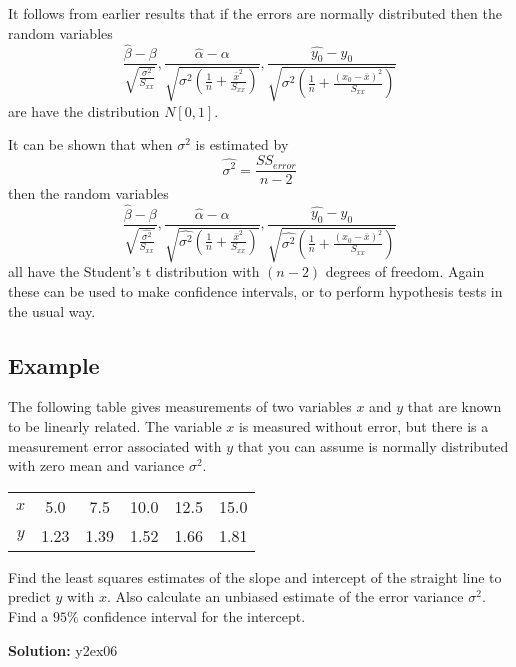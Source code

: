 \documentclass[12pt]{article}
\newenvironment{example}[1][Example:]{\begin{trivlist}
\item[\hskip \labelsep {\bfseries #1}]}{\end{trivlist}}
\begin{document}
It follows from earlier results that if the errors are normally distributed then the random variables
$$\frac{\hat{\beta}-\beta}{\sqrt{\frac{\sigma^{2}}{S_{xx}}}}, \frac{\hat{\alpha}-\alpha}{\sqrt{\sigma^{2}\left(\frac{1}{n}+\frac{\bar{x}^{2}}{S_{xx}}\right)}}, \frac{\hat{y_{0}}-y_{0}}{\sqrt{\sigma^{2}\left(\frac{1}{n}+\frac{(x_{0}-\bar{x})^{2}}{S_{xx}}\right)}}$$
are have the distribution $N[0,1].$

It can be shown that when $\sigma^{2}$ is estimated by $$\hat{\sigma^{2}}=\frac{SS_{error}}{n-2}$$ then the random variables
$$\frac{\hat{\beta}-\beta}{\sqrt{\frac{\hat{\sigma^{2}}}{S_{xx}}}}, \frac{\hat{\alpha}-\alpha}{\sqrt{\hat{\sigma^{2}}\left(\frac{1}{n}+\frac{\bar{x}^{2}}{S_{xx}}\right)}}, \frac{\hat{y_{0}}-y_{0}}{\sqrt{\hat{\sigma^{2}}\left(\frac{1}{n}+\frac{(x_{0}-\bar{x})^{2}}{S_{xx}}\right)}}$$
all have the Student's t distribution with $(n-2)$ degrees of freedom. Again these can be used to make confidence intervals, or to perform hypothesis tests in the usual way.

\subsection{Example}
\begin{example}
The following table gives measurements of two variables $x$ and $y$ that are known to be linearly related. The variable $x$ is measured without error, but there is a measurement error associated with $y$ that you can assume is normally distributed with zero mean and variance $\sigma^{2}$.
\begin{center}
\begin{tabular}{|c|c|c|c|c|c|}
  \hline
$x$&	 5.0&	 7.5&	10.0&	12.5&	15.0\\
$y$& 	1.23&	1.39&	1.52&	1.66&	1.81 \\
  \hline
\end{tabular}
\end{center}
Find the least squares estimates of the slope and intercept of the straight line to predict $y$ with $x$. Also calculate an unbiased estimate of the error variance $\sigma^{2}$. Find a $95\%$ confidence interval for the intercept.									
\end{example}

\begin{mdframed}
{\bf Solution:}
\textcolor[rgb]{1.00,1.00,1.00}{y2ex06\lipsum[1-7]}
\end{mdframed}
\end{document}
